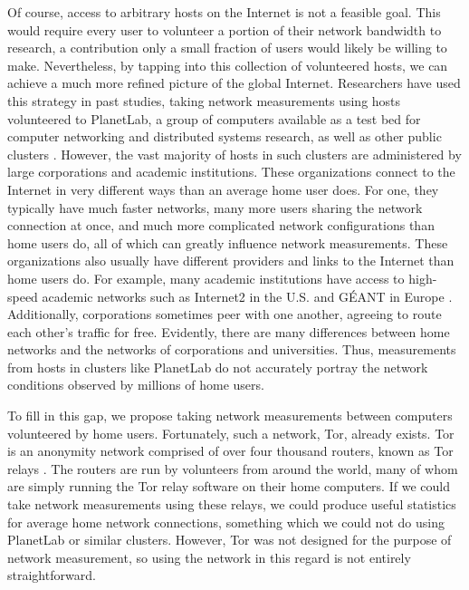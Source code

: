 \documentclass[twocolumn,11pt]{article}
\begin{document}
Of course, access to arbitrary hosts on the Internet is not a feasible goal. This would require every user to volunteer a portion of their network bandwidth to research, a contribution only a small fraction of users would likely be willing to make. Nevertheless, by tapping into this collection of volunteered hosts, we can achieve a much more refined picture of the global Internet. Researchers have used this strategy in past studies, taking network measurements using hosts volunteered to PlanetLab, a group of computers available as a test bed for computer networking and distributed systems research, as well as other public clusters \cite{PlanetLab}. However, the vast majority of hosts in such clusters are administered by large corporations and academic institutions. These organizations connect to the Internet in very different ways than an average home user does. For one, they typically have much faster networks, many more users sharing the network connection at once, and much more complicated network configurations than home users do, all of which can greatly influence network measurements. These organizations also usually have different providers and links to the Internet than home users do. For example, many academic institutions have access to high-speed academic networks such as Internet2 in the U.S. and G\'EANT in Europe \cite{Geant}. Additionally, corporations sometimes peer with one another, agreeing to route each other’s traffic for free. Evidently, there are many differences between home networks and the networks of corporations and universities. Thus, measurements from hosts in clusters like PlanetLab do not accurately portray the network conditions observed by millions of home users.

To fill in this gap, we propose taking network measurements between computers volunteered by home users. Fortunately, such a network, Tor, already exists. Tor is an anonymity network comprised of over four thousand routers, known as Tor relays \cite{Tor}. The routers are run by volunteers from around the world, many of whom are simply running the Tor relay software on their home computers. If we could take network measurements using these relays, we could produce useful statistics for average home network connections, something which we could not do using PlanetLab or similar clusters. However, Tor was not designed for the purpose of network measurement, so using the network in this regard is not entirely straightforward.
\end{document}
